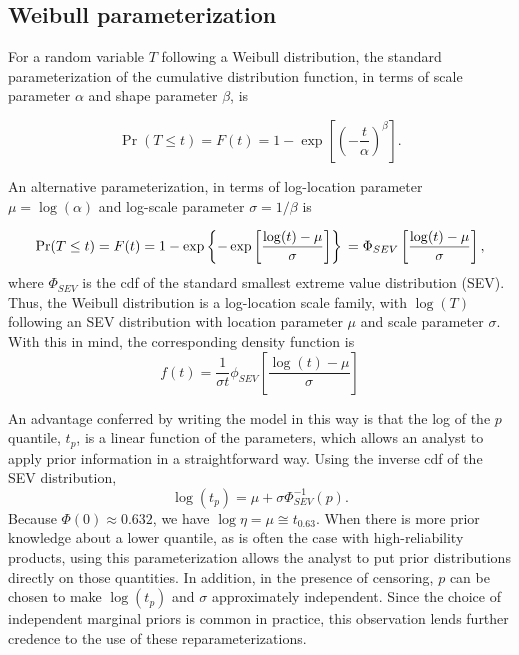 \documentclass[12pt]{article}
\begin{document}
\subsection{Weibull parameterization}
\label{sec:Weibull parameterization}
For a random variable $T$ following a Weibull distribution, the standard parameterization of the cumulative distribution function, in terms of scale parameter $\alpha$ and shape parameter $\beta$, is

$$ \Pr(T \le t) = F(t) = 1 - \exp \left[ \left( -\frac{t}{\alpha} \right)^\beta \right]. $$

An alternative parameterization, in terms of log-location parameter $\mu = \log (\alpha)$ and log-scale parameter $\sigma = 1/\beta$ is

\begin{equation} \Pr(T \le t) = F(t) = 1 - \exp \left\{ -\exp \left[ \frac{ \log (t) - \mu }{\sigma} \right] \right\}\\
= \Phi_{SEV}\left[\frac{\log (t) - \mu}{\sigma}\right],
\end{equation}
where $\Phi_{SEV}$ is the cdf of the standard smallest extreme value distribution (SEV). Thus, the Weibull distribution is a log-location scale family, with $\log(T)$ following an SEV distribution with location parameter $\mu$ and scale parameter $\sigma$. With this in mind, the corresponding density function is
\begin{equation}
f(t) =\frac{1}{\sigma t} \phi_{SEV}\left[\frac{\log(t) - \mu}{\sigma}\right]
\end{equation}

An advantage conferred by writing the model in this way is that the log of the $p$ quantile, $t_p$, is a linear function of the parameters, which allows an analyst to apply prior information in a straightforward way.  Using the inverse cdf of the SEV distribution,
\begin{equation}
\log(t_p) = \mu + \sigma \Phi_{SEV}^{-1}(p).
\end{equation}
Because $\Phi(0)\approx 0.632$, we have $\log{\eta} = \mu  \cong t_{0.63}$. When there is more prior knowledge about a lower quantile, as is often the case with high-reliability products, using this parameterization allows the analyst to put prior distributions directly on those quantities. In addition, in the presence of censoring, $p$ can be chosen to make $\log(t_p)$ and $\sigma$ approximately independent. Since the choice of independent marginal priors is common in practice, this observation lends further credence to the use of these reparameterizations.
\end{document}

